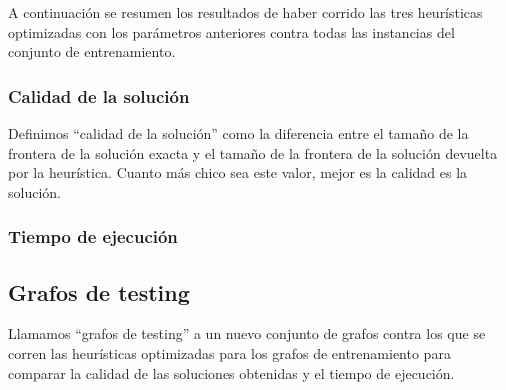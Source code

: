 \documentclass[a4paper, 10pt, twoside]{article}
\begin{document}
A continuación se resumen los resultados de haber corrido las tres heurísticas optimizadas con los parámetros anteriores contra todas las instancias del conjunto de entrenamiento.


\subsubsection{Calidad de la solución}

Definimos ``calidad de la solución'' como la diferencia entre el tamaño de la frontera de la solución exacta y el tamaño de la frontera de la solución devuelta por la heurística. Cuanto más chico sea este valor, mejor es la calidad es la solución.


\begin{figure}[H]
	
\end{figure}

\begin{figure}[H]
	
\end{figure}

\begin{figure}[H]
	
\end{figure}


\subsubsection{Tiempo de ejecución}

\begin{figure}[H]
	
\end{figure}

\begin{figure}[H]
	
\end{figure}

\begin{figure}[H]
	
\end{figure}


\subsection{Grafos de testing}

Llamamos ``grafos de testing'' a un nuevo conjunto de grafos contra los que se corren las heurísticas optimizadas para los grafos de entrenamiento para comparar la calidad de las soluciones obtenidas y el tiempo de ejecución.
\end{document}
